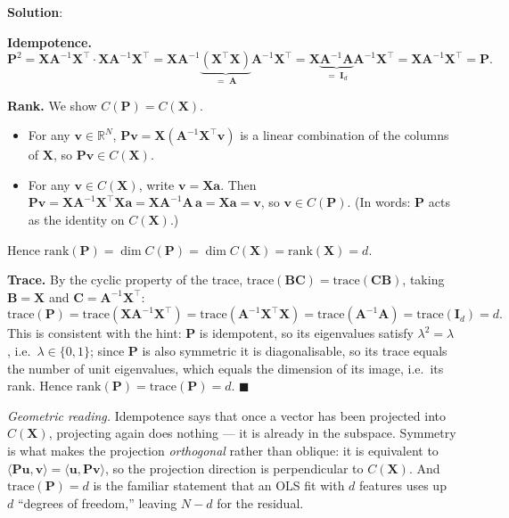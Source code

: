 \documentclass[submit]{../harvardml}
\newenvironment{solution}{
    \vspace{2mm}
    \color{blue}\noindent\textbf{Solution}:
}{}
\begin{document}
\begin{solution}
\begin{enumerate}
\textbf{Idempotence.}
\[
  \mathbf P^2
  = \mathbf X \mathbf A^{-1}\mathbf X^\top \cdot \mathbf X \mathbf A^{-1}\mathbf X^\top
  = \mathbf X \mathbf A^{-1}\underbrace{\left(\mathbf X^\top \mathbf X\right)}_{=\;\mathbf A}\mathbf A^{-1}\mathbf X^\top
  = \mathbf X \underbrace{\mathbf A^{-1}\mathbf A}_{=\;\mathbf I_d}\mathbf A^{-1}\mathbf X^\top
  = \mathbf X \mathbf A^{-1}\mathbf X^\top = \mathbf P .
\]

\textbf{Rank.} We show $C(\mathbf P) = C(\mathbf X)$.
\begin{itemize}
  \item[($\subseteq$)] For any $\mathbf v \in \mathbb{R}^N$,
    $\mathbf P \mathbf v = \mathbf X\left(\mathbf A^{-1}\mathbf X^\top \mathbf v\right)$
    is a linear combination of the columns of $\mathbf X$, so
    $\mathbf P\mathbf v \in C(\mathbf X)$.
  \item[($\supseteq$)] For any $\mathbf v \in C(\mathbf X)$, write
    $\mathbf v = \mathbf X\mathbf a$. Then
    $\mathbf P \mathbf v = \mathbf X \mathbf A^{-1}\mathbf X^\top \mathbf X \mathbf a
     = \mathbf X\mathbf A^{-1}\mathbf A\,\mathbf a = \mathbf X \mathbf a = \mathbf v$,
    so $\mathbf v \in C(\mathbf P)$. (In words: $\mathbf P$ acts as the identity
    on $C(\mathbf X)$.)
\end{itemize}
Hence $\mathrm{rank}(\mathbf P) = \dim C(\mathbf P) = \dim C(\mathbf X)
= \mathrm{rank}(\mathbf X) = d$.

\textbf{Trace.} By the cyclic property of the trace,
$\mathrm{trace}(\mathbf{BC}) = \mathrm{trace}(\mathbf{CB})$, taking
$\mathbf B = \mathbf X$ and $\mathbf C = \mathbf A^{-1}\mathbf X^\top$:
\[
  \mathrm{trace}(\mathbf P)
  = \mathrm{trace}\!\left(\mathbf X \mathbf A^{-1}\mathbf X^\top\right)
  = \mathrm{trace}\!\left(\mathbf A^{-1}\mathbf X^\top \mathbf X\right)
  = \mathrm{trace}\!\left(\mathbf A^{-1}\mathbf A\right)
  = \mathrm{trace}(\mathbf I_d) = d .
\]
This is consistent with the hint: $\mathbf P$ is idempotent, so its eigenvalues
satisfy $\lambda^2 = \lambda$, i.e.\ $\lambda \in \{0,1\}$; since $\mathbf P$ is
also symmetric it is diagonalisable, so its trace equals the number of unit
eigenvalues, which equals the dimension of its image, i.e.\ its rank. Hence
$\mathrm{rank}(\mathbf P) = \mathrm{trace}(\mathbf P) = d$. $\blacksquare$

\medskip
\noindent\emph{Geometric reading.} Idempotence says that once a vector has been
projected into $C(\mathbf X)$, projecting again does nothing --- it is already in
the subspace. Symmetry is what makes the projection \emph{orthogonal} rather
than oblique: it is equivalent to $\langle \mathbf P\mathbf u, \mathbf v\rangle =
\langle \mathbf u, \mathbf P\mathbf v\rangle$, so the projection direction is
perpendicular to $C(\mathbf X)$. And $\mathrm{trace}(\mathbf P) = d$ is the
familiar statement that an OLS fit with $d$ features uses up $d$ ``degrees of
freedom,'' leaving $N - d$ for the residual.


\end{enumerate}
\end{solution}
\end{document}
